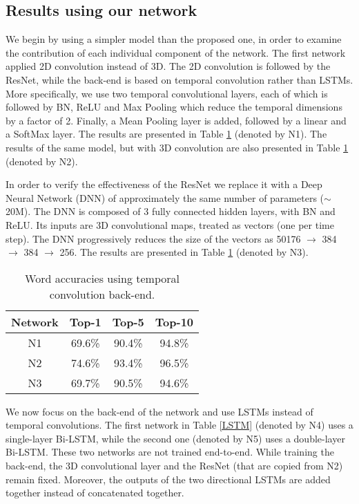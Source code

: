 \documentclass[a4paper]{article}
\begin{document}
\subsection{Results using our network}
We begin by using a simpler model than the proposed one, in order to examine the contribution of each individual component of the network. The first network applied 2D convolution instead of 3D. The 2D convolution is followed by the ResNet, while the back-end is based on temporal convolution rather than LSTMs. More specifically, we use two temporal convolutional layers, each of which is followed by BN, ReLU and Max Pooling which reduce the temporal dimensions by a factor of 2. Finally, a Mean Pooling layer is added, followed by a linear and a SoftMax layer. The results are presented in Table \ref{Temporal} (denoted by N1). The results of the same model, but with 3D convolution are also presented in Table \ref{Temporal} (denoted by N2). 

In order to verify the effectiveness of the ResNet we replace it with a Deep Neural Network (DNN) of approximately the same number of parameters ($\sim$20M). The DNN is composed of 3 fully connected hidden layers, with BN and ReLU. Its inputs are 3D convolutional maps, treated as vectors (one per time step). The DNN progressively reduces the size of the vectors as 50176 $\rightarrow$ 384 $\rightarrow$ 384 $\rightarrow$ 256. The results are presented in Table \ref{Temporal} (denoted by N3).  

\begin{table}[!htbp]
\centering
\begin{tabular}{| c || c | c | c|} 
\hline
Network & Top-1 & Top-5 & Top-10 \\ [0.5ex] 
\hline
N1 & 69.6\% & 90.4\% & 94.8\% \\ 
\hline
N2 & 74.6\% & 93.4\% & 96.5\% \\ 
\hline
N3 & 69.7\% & 90.5\% & 94.6\% \\ 
\hline
\end{tabular}
\vspace{1mm}\caption{Word accuracies using temporal convolution back-end.}\label{Temporal}
\end{table}

We now focus on the back-end of the network and use LSTMs instead of temporal convolutions. The first network in Table \ref{LSTM} (denoted by N4) uses a single-layer Bi-LSTM, while the second one (denoted by N5) uses a double-layer Bi-LSTM. These two networks are not trained end-to-end. While training the back-end, the 3D convolutional layer and the ResNet (that are copied from N2) remain fixed. Moreover, the outputs of the two directional LSTMs are added together instead of concatenated together.  
\end{document}
